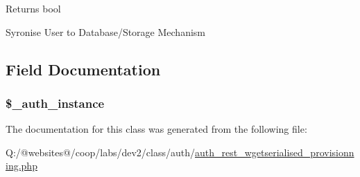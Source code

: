 \begin{DoxyReturn}{Returns}
bool 
\end{DoxyReturn}
Syronise User to Database/\-Storage Mechanism

\subsection{Field Documentation}
\hypertarget{class_xortify_auth_rest___wgetserialised_provisionning_a486ed878bb5a7188c99ac4c9ee46ac6e}{
\subsubsection[{\$\-\_\-auth\-\_\-instance}]{\setlength{\rightskip}{0pt plus 5cm}\$\-\_\-auth\-\_\-instance}}\label{class_xortify_auth_rest___wgetserialised_provisionning_a486ed878bb5a7188c99ac4c9ee46ac6e}


The documentation for this class was generated from the following file\-:\begin{DoxyCompactItemize}
\item 
Q\-:/@websites@/coop/labs/dev2/class/auth/\hyperlink{auth__rest__wgetserialised__provisionning_8php}{auth\-\_\-rest\-\_\-wgetserialised\-\_\-provisionning.\-php}\end{DoxyCompactItemize}
